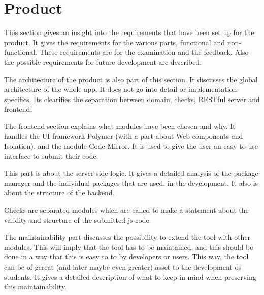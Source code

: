
\section{Product}
This section gives an insight into the requirements that have been set up for the product.
It gives the requirements for the various parts, functional and non-functional.
These requirements are for the examination and the feedback.
Also the possible requirements for future development are described.

The architecture of the product is also part of this section. 
It discusses the global architecture of the whole app.
It does not go into detail or implementation specifics.
Its clearifies the separation between domain, \glspl{check},
RESTful server and frontend.



The frontend section explains what modules have been chosen and why.
It handles the UI framework Polymer (with a part about Web components and
Isolation), and the module Code Mirror.
It is used to give
the user an easy to use interface to submit their code.

This part is about the server side logic. It gives a detailed analysis of the
package manager and the individual packages that are used.
in the development. It also is about the structure of the backend.

Checks are separated modules which are called to make a statement
about the validity and structure of the submitted \gls{js-code}.


The maintainability part discusses the possibility to extend the tool with other modules.
This will imply that the tool has to be maintained, and this should be done in a way that this is easy to to by developers or users. This way, the tool can be of gereat (and later maybe even greater) asset to the development os students.
It gives a detailed description of what to keep in mind when preserving this maintainability.


